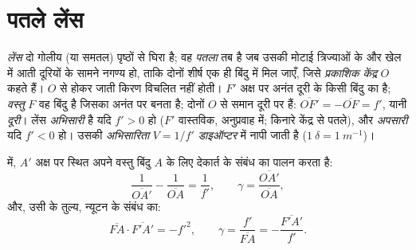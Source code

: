 \section{पतले लेंस}

\begin{definition}[पतला लेंस]\label{def:b1:mirrors-thin-lenses:lens}
\emph{लेंस} दो गोलीय (या समतल) पृष्ठों से घिरा  है; वह
\emph{पतला} तब है जब उसकी मोटाई त्रिज्याओं के और खेल में आती दूरियों के सामने
नगण्य हो, ताकि दोनों शीर्ष एक ही बिंदु में मिल जाएँ, जिसे
\emph{प्रकाशिक केंद्र} $O$ कहते हैं। $O$ से होकर जाती किरण विचलित नहीं होती।
\emph{ } $F'$ अक्ष पर अनंत दूरी के किसी बिंदु का  है;
\emph{वस्तु } $F$ वह बिंदु है जिसका  अनंत पर बनता है; दोनों $O$
से समान दूरी पर हैं: $\overline{OF'} = -\overline{OF} = f'$, यानी
\emph{ दूरी}। लेंस \emph{अभिसारी} है यदि $f' > 0$ हो ($F'$ वास्तविक,
अनुप्रवाह में; किनारे केंद्र से पतले), और \emph{अपसारी} यदि $f' < 0$ हो।
उसकी \emph{अभिसारिता} $V = 1/f'$ \emph{डाइऑप्टर} में नापी जाती है
($\qty{1}{\delta} = \qty{1}{m^{-1}}$)।
\end{definition}

\begin{theorem}[पतले लेंस के लिए संयुग्मन]\label{thm:b1:mirrors-thin-lenses:lensconj}
 में,  $A'$ अक्ष पर स्थित अपने वस्तु बिंदु $A$ के लिए
देकार्त के संबंध का पालन करता है:
\[
\frac{1}{\overline{OA'}} - \frac{1}{\overline{OA}} = \frac{1}{f'},
\qquad
\gamma = \frac{\overline{OA'}}{\overline{OA}},
\]
और, उसी के तुल्य, न्यूटन के संबंध का:
\[
\overline{FA}\cdot\overline{F'A'} = -f'^2,
\qquad
\gamma = \frac{f'}{\overline{FA}} = -\frac{\overline{F'A'}}{f'} .
\]
\end{theorem}

